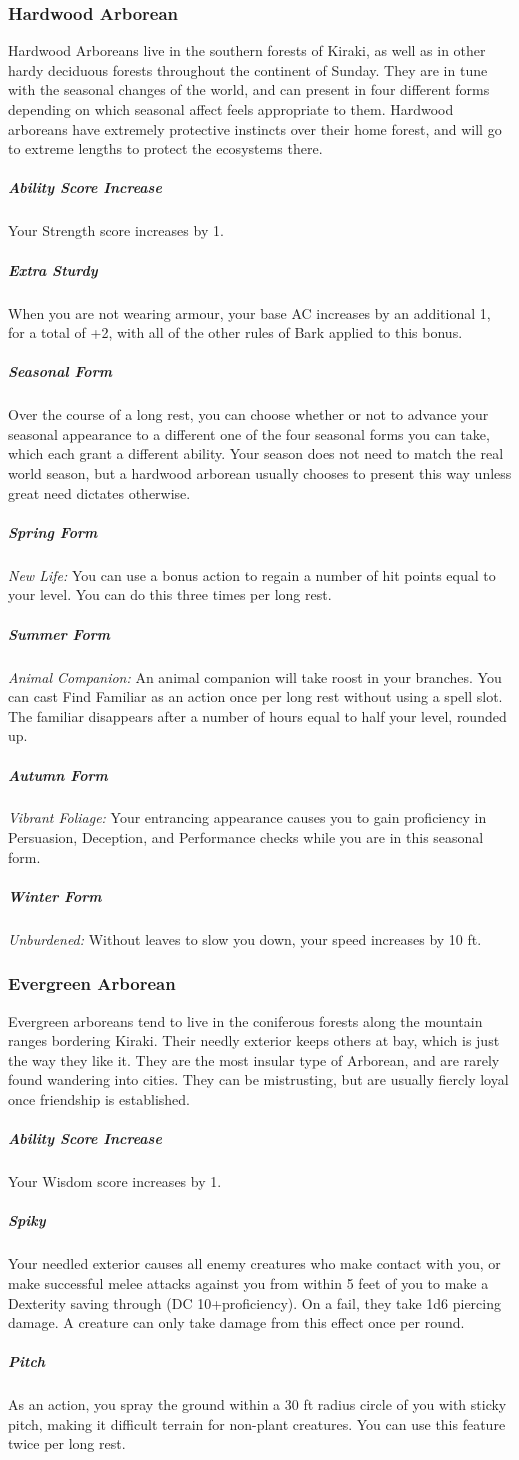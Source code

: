 \subsubsection{Hardwood Arborean}
Hardwood Arboreans live in the southern forests of Kiraki, as well as in other hardy deciduous forests throughout the continent of Sunday. They are in tune with the seasonal changes of the world, and can present in four different forms depending on which seasonal affect feels appropriate to them. Hardwood arboreans have extremely protective instincts over their home forest, and will go to extreme lengths to protect the ecosystems there.
\subparagraph{Ability Score Increase}Your Strength score increases by 1.
\subparagraph{Extra Sturdy}When you are not wearing armour, your base AC increases by an additional 1, for a total of +2, with all of the other rules of Bark applied to this bonus.
\subparagraph{Seasonal Form}Over the course of a long rest, you can choose whether or not to advance your seasonal appearance to a different one of the four seasonal forms you can take, which each grant a different ability. Your season does not need to match the real world season, but a hardwood arborean usually chooses to present this way unless great need dictates otherwise.
\subparagraph{Spring Form}\textit{New Life:} You can use a bonus action to regain a number of hit points equal to your level. You can do this three times per long rest.
\subparagraph{Summer Form}\textit{Animal Companion:} An animal companion will take roost in your branches. You can cast Find Familiar as an action once per long rest without using a spell slot. The familiar disappears after a number of hours equal to half your level, rounded up.
\subparagraph{Autumn Form}\textit{Vibrant Foliage:} Your entrancing appearance causes you to gain proficiency in Persuasion, Deception, and Performance checks while you are in this seasonal form.
\subparagraph{Winter Form}\textit{Unburdened:} Without leaves to slow you down, your speed increases by 10 ft.

\subsubsection{Evergreen Arborean}
Evergreen arboreans tend to live in the coniferous forests along the mountain ranges bordering Kiraki. Their needly exterior keeps others at bay, which is just the way they like it. They are the most insular type of Arborean, and are rarely found wandering into cities. They can be mistrusting, but are usually fiercly loyal once friendship is established.
\subparagraph{Ability Score Increase}Your Wisdom score increases by 1.
\subparagraph{Spiky}Your needled exterior causes all enemy creatures who make contact with you, or make successful melee attacks against you from within 5 feet of you to make a Dexterity saving through (DC 10+proficiency). On a fail, they take 1d6 piercing damage. A creature can only take damage from this effect once per round.
\subparagraph{Pitch}As an action, you spray the ground within a 30 ft radius circle of you with sticky pitch, making it difficult terrain for non-plant creatures. You can use this feature twice per long rest.

